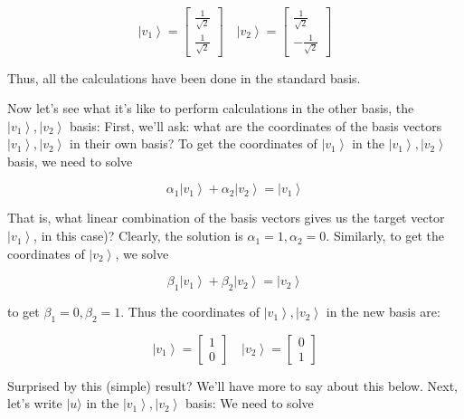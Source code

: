 \documentclass[main.tex]{subfiles}
\begin{document}
    $$
    \left|v_{1}\right\rangle=\left[\begin{array}{c}
    \frac{1}{\sqrt{2}} \\
    \frac{1}{\sqrt{2}}
    \end{array}\right] \quad\left|v_{2}\right\rangle=\left[\begin{array}{r}
    \frac{1}{\sqrt{2}} \\
    -\frac{1}{\sqrt{2}}
    \end{array}\right]
    $$
    
    Thus, all the calculations have been done in the standard basis.
    
    Now let's see what it's like to perform calculations in the other basis, the $\left|v_{1}\right\rangle,\left|v_{2}\right\rangle$ basis: First, we'll ask: what are the coordinates of the basis vectors $\left|v_{1}\right\rangle,\left|v_{2}\right\rangle$ in their own basis? To get the coordinates of $\left|v_{1}\right\rangle$ in the $\left|v_{1}\right\rangle,\left|v_{2}\right\rangle$ basis, we need to solve
    
    $$
    \alpha_{1}\left|v_{1}\right\rangle+\alpha_{2}\left|v_{2}\right\rangle=\left|v_{1}\right\rangle
    $$
    
    That is, what linear combination of the basis vectors gives us the target vector $\left|v_{1}\right\rangle$, in this case)? Clearly, the solution is $\alpha_{1}=1, \alpha_{2}=0$. Similarly, to get the coordinates of $\left|v_{2}\right\rangle$, we solve
    
    $$
    \beta_{1}\left|v_{1}\right\rangle+\beta_{2}\left|v_{2}\right\rangle=\left|v_{2}\right\rangle
    $$
    
    to get $\beta_{1}=0, \beta_{2}=1$. Thus the coordinates of $\left|v_{1}\right\rangle,\left|v_{2}\right\rangle$ in the new basis are:
    
    $$
    \left|v_{1}\right\rangle=\left[\begin{array}{l}
    1 \\
    0
    \end{array}\right] \quad\left|v_{2}\right\rangle=\left[\begin{array}{l}
    0 \\
    1
    \end{array}\right]
    $$
    
    Surprised by this (simple) result? We'll have more to say about this below. Next, let's write $|u\rangle$ in the $\left|v_{1}\right\rangle,\left|v_{2}\right\rangle$ basis: We need to solve
    
\end{document}
